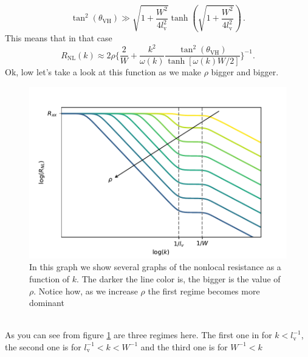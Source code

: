 \begin{equation}
    \tan^2(\theta_{\textrm{VH}})\gg \sqrt{1+\frac {W^2}{4l_{\textrm{v}}^2}}\tanh\left(\sqrt{1+\frac {W^2}{4l_{\textrm{v}}^2}}\right)
    \label{eq:highrhocond}\,.
\end{equation}
This means that in that case
\begin{equation}
     R_{\textrm{NL}}(k)\approx 2\rho
    \bigg\{
        \frac 2W+ \frac {k^2}{\omega(k)}\frac{\tan^2(\theta_{\textrm{VH}})}{\tanh[\omega(k)W/2]}    
    \bigg\}^{-1}.
    \label{eq:rhotoinf}
\end{equation}
Ok, low let's take a look at this function as we make $\rho$ bigger and bigger.
\begin{figure}[h!]
    \centering
    \includegraphics[width=\linewidth]{Immagini/rnl/rho2.pdf}
    \caption{In this graph we show several graphs of the nonlocal resistance as a function of $k$. The darker the line color is, the bigger is the value of $\rho$. Notice how, as we increase $\rho$ the first regime becomes more dominant}
    \label{fig:rho2}
\end{figure}\\
As you can see from figure \ref{fig:rho2} are three regimes here. The first one in for $k<l_{\textrm{v}}^{-1}$, the second one is for $l_{\textrm{v}}^{-1}<k<W^{-1}$ and the third one is for $W^{-1}<k$
